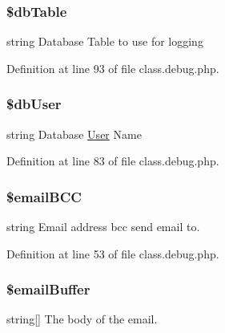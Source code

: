 \hypertarget{class_debug_adfd23e5286c56c7632ecb55887dd2555}{
\subsubsection[{\$db\-Table}]{\setlength{\rightskip}{0pt plus 5cm}\$db\-Table\hspace{0.3cm}{\ttfamily [static]}}}\label{class_debug_adfd23e5286c56c7632ecb55887dd2555}
string Database Table to use for logging 

Definition at line 93 of file class.\-debug.\-php.

\hypertarget{class_debug_a4a92606de85aafdc0dcae4976b7ca669}{
\subsubsection[{\$db\-User}]{\setlength{\rightskip}{0pt plus 5cm}\$db\-User\hspace{0.3cm}{\ttfamily [static]}}}\label{class_debug_a4a92606de85aafdc0dcae4976b7ca669}
string Database \hyperlink{class_user}{User} Name 

Definition at line 83 of file class.\-debug.\-php.

\hypertarget{class_debug_ace2c8fd77a23d56cfdc35a142df1b1ab}{
\subsubsection[{\$email\-B\-C\-C}]{\setlength{\rightskip}{0pt plus 5cm}\$email\-B\-C\-C\hspace{0.3cm}{\ttfamily [static]}}}\label{class_debug_ace2c8fd77a23d56cfdc35a142df1b1ab}
string Email address bcc send email to. 

Definition at line 53 of file class.\-debug.\-php.

\hypertarget{class_debug_a6da5505f5274a47a70fb0cbac5eef25e}{
\subsubsection[{\$email\-Buffer}]{\setlength{\rightskip}{0pt plus 5cm}\$email\-Buffer\hspace{0.3cm}{\ttfamily [static]}}}\label{class_debug_a6da5505f5274a47a70fb0cbac5eef25e}
string\mbox{[}\mbox{]} The body of the email. 

